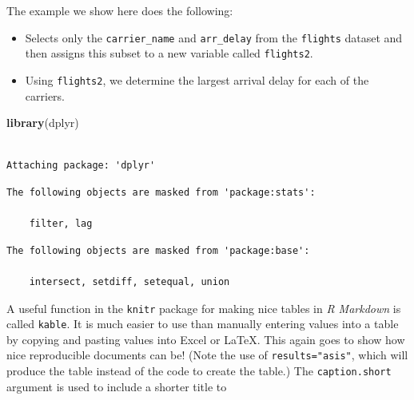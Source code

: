 \documentclass [11pt, proquest] {uwthesis}[2015/03/03]
\newenvironment{Shaded}{}{}
\newcommand{\KeywordTok}[1]{\textcolor[rgb]{0.00,0.44,0.13}{\textbf{{#1}}}}
\newcommand{\DataTypeTok}[1]{\textcolor[rgb]{0.56,0.13,0.00}{{#1}}}
\newcommand{\StringTok}[1]{\textcolor[rgb]{0.25,0.44,0.63}{{#1}}}
\newcommand{\OtherTok}[1]{\textcolor[rgb]{0.00,0.44,0.13}{{#1}}}
\newcommand{\NormalTok}[1]{{#1}}
\newcommand{\OperatorTok}[1]{\textcolor[rgb]{0.00,0.44,0.13}{\textbf{{#1}}}}
\begin{document}
The example we show here does the following:
\begin{itemize}
\item
  Selects only the \texttt{carrier\_name} and \texttt{arr\_delay} from
  the \texttt{flights} dataset and then assigns this subset to a new
  variable called \texttt{flights2}.
\item
  Using \texttt{flights2}, we determine the largest arrival delay for
  each of the carriers.
\end{itemize}
\begin{Shaded}
\begin{Highlighting}[]
\KeywordTok{library}\NormalTok{(dplyr)}
\end{Highlighting}
\end{Shaded}
\begin{verbatim}

Attaching package: 'dplyr'
\end{verbatim}
\begin{verbatim}
The following objects are masked from 'package:stats':

    filter, lag
\end{verbatim}
\begin{verbatim}
The following objects are masked from 'package:base':

    intersect, setdiff, setequal, union
\end{verbatim}
\begin{Shaded}
\end{Shaded}
A useful function in the \texttt{knitr} package for making nice tables
in \emph{R Markdown} is called \texttt{kable}. It is much easier to use
than manually entering values into a table by copying and pasting values
into Excel or LaTeX. This again goes to show how nice reproducible
documents can be! (Note the use of \texttt{results="asis"}, which will
produce the table instead of the code to create the table.) The
\texttt{caption.short} argument is used to include a shorter title to
\end{document}
